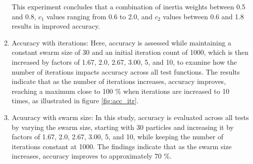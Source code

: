 \documentclass[paper,revised]{geophysics}
\begin{document}
\begin{enumerate}
This experiment concludes that a combination of inertia weights between 0.5 and 0.8, \(c_1\) values ranging from 0.6 to 2.0, and \(c_2\) values between 0.6 and 1.8 results in improved accuracy. 

	\item Accuracy with iterations: Here, accuracy is assessed while maintaining a constant swarm size of 30 and an initial iteration count of 1000, which is then increased by factors of 1.67, 2.0, 2.67, 3.00, 5, and 10, to examine how the number of iterations impacts accuracy across all test functions. The results indicate that as the number of iterations increases, accuracy improves, reaching a maximum close to 100 \% when iterations are increased to 10 times, as illustrated in figure \ref{fig:acc_itr}.
	
	\item Acuuracy with swarm size: In this study, accuracy is evaluated across all tests by varying the swarm size, starting with 30 particles and increasing it by factors of 1.67, 2.0, 2.67, 3.00, 5, and 10, while keeping the number of iterations constant at 1000. The findings indicate that as the swarm size increases, accuracy improves to approximately 70 \%.
\end{enumerate}
\end{document}
